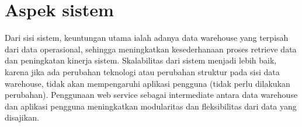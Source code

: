 \section{Aspek sistem}
Dari sisi sistem, keuntungan utama ialah adanya data warehouse yang terpisah dari data operasional, sehingga meningkatkan kesederhanaan proses retrieve data dan peningkatan kinerja sistem. Skalabilitas dari sistem menjadi lebih baik, karena jika ada perubahan teknologi atau perubahan struktur pada sisi data warehouse, tidak akan mempengaruhi aplikasi pengguna (tidak perlu dilakukan perubahan). 
Penggunaan web service sebagai intermediate antara data warehouse dan aplikasi pengguna meningkatkan modularitas dan fleksibilitas dari data yang disajikan.
